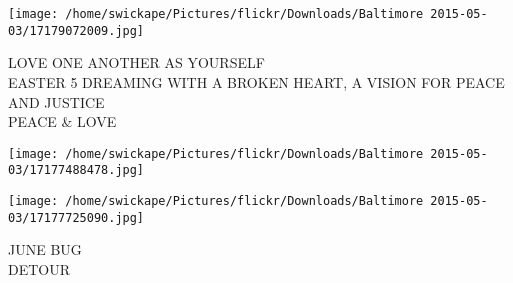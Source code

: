 \documentclass[10pt,letterpaper]{article}
\begin{document}
\texttt{[image: /home/swickape/Pictures/flickr/Downloads/Baltimore 2015-05-03/17179072009.jpg]}

LOVE ONE ANOTHER AS YOURSELF\\
EASTER 5 DREAMING WITH A BROKEN HEART, A VISION FOR PEACE AND JUSTICE\\
PEACE \& LOVE\\
\pagebreak

\texttt{[image: /home/swickape/Pictures/flickr/Downloads/Baltimore 2015-05-03/17177488478.jpg]}

\vspace{0.25in}
\texttt{[image: /home/swickape/Pictures/flickr/Downloads/Baltimore 2015-05-03/17177725090.jpg]}

JUNE BUG\\
DETOUR\\
\pagebreak
\end{document}
